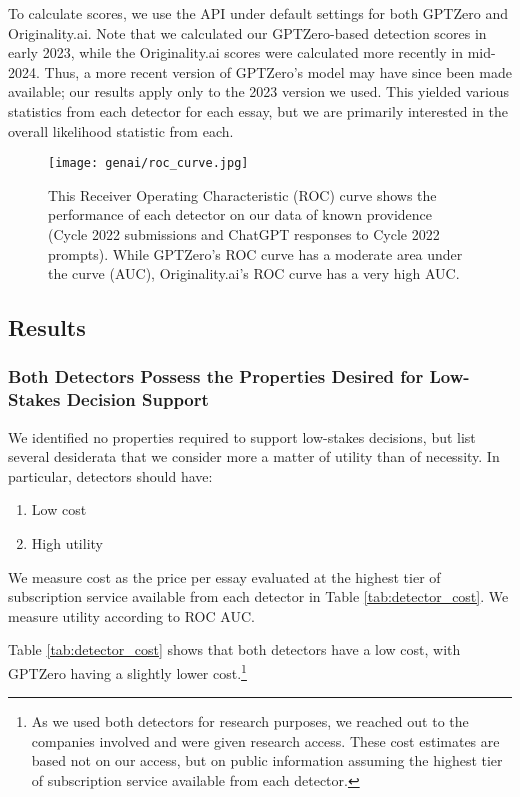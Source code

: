 To calculate scores, we use the API under default settings for both GPTZero and Originality.ai. Note that we calculated our GPTZero-based detection scores in early 2023, while the Originality.ai scores were calculated more recently in mid-2024. Thus, a more recent version of GPTZero's model may have since been made available; our results apply only to the 2023 version we used. This yielded various statistics from each detector for each essay, but we are primarily interested in the overall likelihood statistic from each.

\begin{figure}[htb]
  \centering
  \texttt{[image: genai/roc\_curve.jpg]}
  \caption{This Receiver Operating Characteristic (ROC) curve shows the performance of each detector on our data of known providence (Cycle 2022 submissions and ChatGPT responses to Cycle 2022 prompts). While GPTZero's ROC curve has a moderate area under the curve (AUC), Originality.ai's ROC curve has a very high AUC.}
  \label{fig:roc_auc}
\end{figure}

\subsection{Results}
\subsubsection{Both Detectors Possess the Properties Desired for Low-Stakes Decision Support}
We identified no properties required to support low-stakes decisions, but list several desiderata that we consider more a matter of utility than of necessity. In particular, detectors should have:

\begin{enumerate}
    \item Low cost
    \item High utility
\end{enumerate}

We measure cost as the price per essay evaluated at the highest tier of subscription service available from each detector in Table \ref{tab:detector_cost}. We measure utility according to ROC AUC.

Table \ref{tab:detector_cost} shows that both detectors have a low cost, with GPTZero having a slightly lower cost.\footnote{As we used both detectors for research purposes, we reached out to the companies involved and were given research access. These cost estimates are based not on our access, but on public information assuming the highest tier of subscription service available from each detector.}

